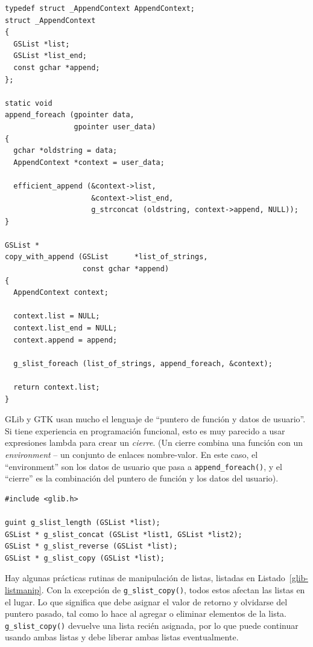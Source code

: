 \begin{lstlisting}
typedef struct _AppendContext AppendContext;
struct _AppendContext
{
  GSList *list;
  GSList *list_end;
  const gchar *append;
};

static void
append_foreach (gpointer data,
                gpointer user_data)
{
  gchar *oldstring = data;
  AppendContext *context = user_data;

  efficient_append (&context->list,
                    &context->list_end,
                    g_strconcat (oldstring, context->append, NULL));
}

GSList *
copy_with_append (GSList      *list_of_strings,
                  const gchar *append)
{
  AppendContext context;

  context.list = NULL;
  context.list_end = NULL;
  context.append = append;

  g_slist_foreach (list_of_strings, append_foreach, &context);

  return context.list;
}
\end{lstlisting}

GLib y GTK usan mucho el lenguaje de ``puntero de función y datos de usuario''. Si tiene experiencia en programación funcional, esto es muy parecido a usar expresiones lambda para crear un \emph{cierre}. (Un cierre combina una función con un \emph{environment} -- un conjunto de enlaces nombre-valor. En este caso, el ``environment'' son los datos de usuario que pasa a \lstinline{append_foreach()}, y el ``cierre'' es la combinación del puntero de función y los datos del usuario).

\begin{lstlisting}[float, caption={Manipular una lista vinculada}, label=glib-listmanip]
#include <glib.h>

guint g_slist_length (GSList *list);
GSList * g_slist_concat (GSList *list1, GSList *list2);
GSList * g_slist_reverse (GSList *list);
GSList * g_slist_copy (GSList *list);
\end{lstlisting}

Hay algunas prácticas rutinas de manipulación de listas, listadas en Listado~\ref{glib-listmanip}. Con la excepción de \lstinline{g_slist_copy()}, todos estos afectan las listas en el lugar. Lo que significa que debe asignar el valor de retorno y olvidarse del puntero pasado, tal como lo hace al agregar o eliminar elementos de la lista. \lstinline{g_slist_copy()} devuelve una lista recién asignada, por lo que puede continuar usando ambas listas y debe liberar ambas listas eventualmente.

